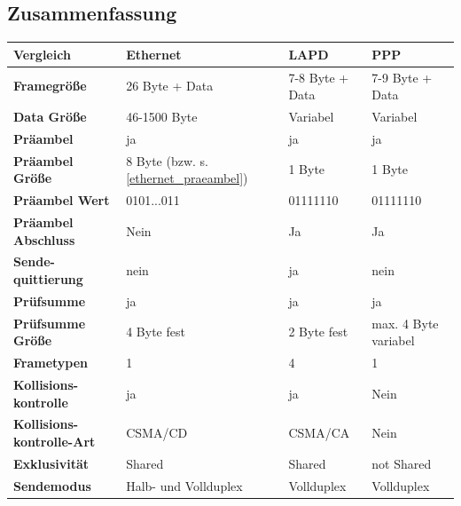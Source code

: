 \documentclass[12pt, a4paper, ngerman]{article}
\begin{document}
\subsection{Zusammenfassung}

\begin{tabular}{| m{\dimexpr.2\linewidth} || m{\dimexpr.2\linewidth} | m{\dimexpr.2\linewidth} | m{\dimexpr.2\linewidth} |}
\hline
\textbf{Vergleich} & \textbf{Ethernet} & \textbf{LAPD} & \textbf{PPP} \\ \hline \hline

\textbf{Framegröße} & 26 Byte + Data & 7-8 Byte + Data & 7-9 Byte + Data \\ \hline

\textbf{Data Größe} & 46-1500 Byte & Variabel & Variabel \\ \hline

\textbf{Präambel} & ja & ja & ja\\ \hline

\textbf{Präambel Größe} & 8 Byte (bzw. s. \ref{ethernet_praeambel})  & 1 Byte & 1 Byte\\ \hline

\textbf{Präambel Wert} & 0101...011  & 01111110 & 01111110\\ \hline

\textbf{Präambel Abschluss} & Nein & Ja & Ja\\ \hline

\textbf{Sende-quittierung} & nein & ja & nein\\ \hline

\textbf{Prüfsumme} & ja & ja & ja\\ \hline

\textbf{Prüfsumme Größe} & 4 Byte fest & 2 Byte fest & max. 4 Byte variabel \\ \hline

\textbf{Frametypen} & 1 & 4 &  1\\ \hline

\textbf{Kollisions-kontrolle} & ja & ja & Nein\\ \hline

\textbf{Kollisions-kontrolle-Art} & CSMA/CD & CSMA/CA & Nein\\ \hline

\textbf{Exklusivität} & Shared & Shared & not Shared\\ \hline

\textbf{Sendemodus} & Halb- und Vollduplex & Vollduplex & Vollduplex \\ \hline
\end{tabular}


   
\nocite{*} 

\newpage
\sloppy
\printbibliography 



\newpage
\listoffigures
\end{document}
